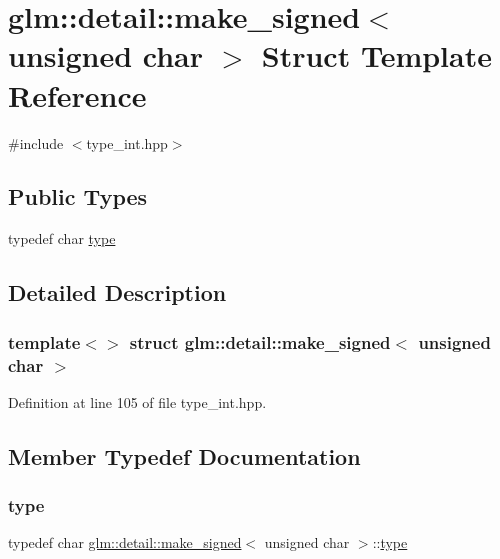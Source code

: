 \hypertarget{structglm_1_1detail_1_1make__signed_3_01unsigned_01char_01_4}{}\section{glm\+::detail\+::make\+\_\+signed$<$ unsigned char $>$ Struct Template Reference}
\label{structglm_1_1detail_1_1make__signed_3_01unsigned_01char_01_4}


{\ttfamily \#include $<$type\+\_\+int.\+hpp$>$}

\subsection*{Public Types}
\begin{DoxyCompactItemize}
\item 
typedef char \mbox{\hyperlink{structglm_1_1detail_1_1make__signed_3_01unsigned_01char_01_4_a38e3001baf7964626c6e7dff83b4ba95}{type}}
\end{DoxyCompactItemize}


\subsection{Detailed Description}
\subsubsection*{template$<$$>$\newline
struct glm\+::detail\+::make\+\_\+signed$<$ unsigned char $>$}



Definition at line 105 of file type\+\_\+int.\+hpp.



\subsection{Member Typedef Documentation}
\mbox{\label{structglm_1_1detail_1_1make__signed_3_01unsigned_01char_01_4_a38e3001baf7964626c6e7dff83b4ba95}} 
\subsubsection{\texorpdfstring{type}{type}}
{\footnotesize\ttfamily typedef char \mbox{\hyperlink{structglm_1_1detail_1_1make__signed}{glm\+::detail\+::make\+\_\+signed}}$<$ unsigned char $>$\+::\mbox{\hyperlink{structglm_1_1detail_1_1make__signed_3_01unsigned_01char_01_4_a38e3001baf7964626c6e7dff83b4ba95}{type}}}



